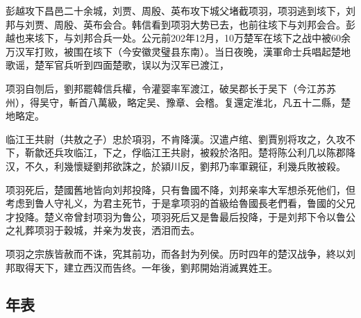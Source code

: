 彭越攻下昌邑二十余城，刘贾、周殷、英布攻下城父堵截项羽，项羽逃到垓下，刘邦与刘贾、周殷、英布会合。韩信看到项羽大势已去，也前往垓下与刘邦会合。彭越也来垓下，与刘邦合兵一处。公元前202年12月，10万楚军在垓下之战中被60余万汉军打败，被围在垓下（今安徽灵璧县东南）。当日夜晚，漢軍命士兵唱起楚地歌谣，楚军官兵听到四面楚歌，误以为汉军已渡江，

项羽自刎后，劉邦罷韓信兵權，令灌婴率军渡江，破吴郡长于吴下（今江苏苏州），得吴守，斬首八萬級，略定吴、豫章、会稽。复還定淮北，凡五十二縣，楚地略定。

临江王共尉（共敖之子）忠於項羽，不肯降漢。汉遣卢绾、劉賈别将攻之，久攻不下，靳歙还兵攻临江，下之，俘临江王共尉，被殺於洛阳。楚将陈公利几以陈郡降汉，不久，利幾懷疑劉邦欲誅之，於潁川反，劉邦乃率軍親征，利幾兵敗被殺。

项羽死后，楚國舊地皆向刘邦投降，只有鲁國不降，刘邦亲率大军想杀死他们，但考虑到鲁人守礼义，为君主死节，于是拿项羽的首級给魯國長老們看，鲁國的父兄才投降。楚义帝曾封项羽为鲁公，项羽死后又是鲁最后投降，于是刘邦下令以鲁公之礼葬项羽于穀城，并亲为发丧，洒泪而去。

项羽之宗族皆赦而不诛，究其前功，而各封为列侯。历时四年的楚汉战争，終以刘邦取得天下，建立西汉而告终。一年後，劉邦開始消滅異姓王。

\subsection{年表}

